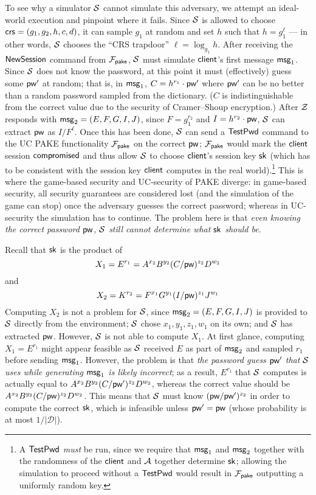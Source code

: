 To see why a simulator $\mathcal{S}$ cannot simulate this adversary, we attempt an ideal-world execution and pinpoint where it fails. Since $\mathcal{S}$ is allowed to choose $\mathsf{crs}=(g_1, g_2, h, c, d)$, it can sample $g_1$ at random and set $h$ such that $h=g_1^{\ell}$ --- in other words, $\mathcal{S}$ chooses the ``CRS trapdoor'' $\ell = \log_{g_1} h$. After receiving the $\mathsf{NewSession}$ command from $\mathcal{F}_{\mathsf{pake}}$, $\mathcal{S}$ must simulate $\mathsf{client}$'s first message $\mathsf{msg}_{1}$. Since $\mathcal{S}$ does not know the password, at this point it must (effectively) guess some $\mathsf{pw}'$ at random; that is, in $\mathsf{msg}_{1}$, $C=h^{r_1}\cdot\mathsf{pw}'$ where $\mathsf{pw}'$ can be no better than a random password sampled from the dictionary. ($C$ is indistinguishable from the correct value due to the security of Cramer--Shoup encryption.) After $\mathcal{Z}$ responds with $\mathsf{msg}_{2} = (E,F,G,I,J)$, since $F = g_1^{r_2}$ and $I = h^{r_2} \cdot \mathsf{pw}$, $\mathcal{S}$ can extract $\mathsf{pw}$ as $I/F^\ell$. Once this has been done, $\mathcal{S}$ can send a $\mathsf{TestPwd}$ command to the UC PAKE functionality $\mathcal{F}_{\mathsf{pake}}$ on the correct $\mathsf{pw}$; $\mathcal{F}_{\mathsf{pake}}$ would mark the $\mathsf{client}$ session $\mathsf{compromised}$ and thus allow $\mathcal{S}$ to choose $\mathsf{client}$'s session key $\mathsf{sk}$ (which has to be consistent with the session key $\mathsf{client}$ computes in the real world).\footnote{A $\mathsf{TestPwd}$ \emph{must} be run, since we require that $\mathsf{msg}_{1}$ and $\mathsf{msg}_{2}$ together with the randomness of the $\mathsf{client}$ and $\mathcal{A}$ together determine $\mathsf{sk}$; allowing the simulation to proceed without a $\mathsf{TestPwd}$ would result in $\mathcal{F}_{\mathsf{pake}}$ outputting a uniformly random key.} This is where the game-based security and UC-security of PAKE diverge: in game-based security, all security guarantees are considered lost (and the simulation of the game can stop) once the adversary guesses the correct password; whereas in UC-security the simulation has to continue. The problem here is that \emph{even knowing the correct password $\mathsf{pw}$, $\mathcal{S}$ still cannot determine what $\mathsf{sk}$ should be}.

Recall that $\mathsf{sk}$ is the product of
\[
X_1 = E^{r_1} = A^{x_2}B^{y_2}(C/\mathsf{pw})^{z_2}D^{w_2}
\]
and
\[
X_2 = K^{r_2} = F^{x_1}G^{y_1}(I/\mathsf{pw})^{z_1}J^{w_1}
\]
Computing $X_2$ is not a problem for $\mathcal{S}$, since $\mathsf{msg}_{2} = (E,F,G,I,J)$ is provided to $\mathcal{S}$ directly from the environment; $\mathcal{S}$ chose $x_1, y_1, z_1, w_1$ on its own; and $\mathcal{S}$ has extracted $\mathsf{pw}$. However, $\mathcal{S}$ is not able to compute $X_1$. At first glance, computing $X_1 = E^{r_1}$ might appear feasible as $\mathcal{S}$ received $E$ as part of $\mathsf{msg}_{2}$ and sampled $r_1$ before sending $\mathsf{msg}_{1}$. However, the problem is that \emph{the password guess $\mathsf{pw}'$ that $\mathcal{S}$ uses while generating $\mathsf{msg}_{1}$ is likely incorrect}; as a result, $E^{r_1}$ that $\mathcal{S}$ computes is actually equal to $A^{x_2}B^{y_2}(C/\mathsf{pw}')^{z_2}D^{w_2}$, whereas the correct value should be $A^{x_2}B^{y_2}(C/\mathsf{pw})^{z_2}D^{w_2}$. This means that $\mathcal{S}$ must know $(\mathsf{pw}/\mathsf{pw}')^{z_2}$ in order to compute the correct $\mathsf{sk}$, which is infeasible unless $\mathsf{pw}'=\mathsf{pw}$ (whose probability is at most $1/\mathcal{|D|}$).

